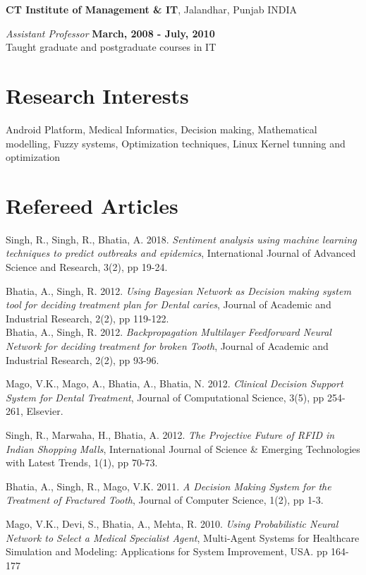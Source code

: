 \documentclass[margin,line]{res}
\begin{document}
\begin{resume}
{\bf CT Institute of Management \& IT}, Jalandhar, Punjab INDIA

\vspace{-.3cm}
{\em Assistant Professor} \hfill {\bf March, 2008 - July, 2010}\\
Taught graduate and postgraduate courses in IT

\section{\sc Research Interests}
Android Platform, Medical Informatics, Decision making, Mathematical modelling, Fuzzy systems, Optimization techniques, Linux Kernel tunning and optimization

\section{\sc Refereed Articles}
Singh, R., Singh, R., Bhatia, A. 2018. \emph{Sentiment analysis using machine learning techniques to predict outbreaks and epidemics}, International Journal of Advanced Science and Research, 3(2), pp 19-24.

Bhatia, A., Singh, R. 2012. \emph{Using Bayesian Network as Decision making system tool for deciding treatment plan for Dental caries}, Journal of Academic and Industrial Research, 2(2), pp 119-122.\\

Bhatia, A., Singh, R. 2012. \emph{Backpropagation Multilayer Feedforward Neural Network for deciding treatment for broken Tooth}, Journal of Academic and Industrial Research, 2(2), pp 93-96.

Mago, V.K., Mago, A., Bhatia, A., Bhatia, N. 2012. \emph{Clinical Decision Support System for Dental Treatment},  Journal of Computational Science, 3(5), pp 254-261, Elsevier.

Singh, R., Marwaha, H., Bhatia, A. 2012. \emph{The Projective Future of RFID in Indian Shopping Malls}, International Journal of Science \& Emerging Technologies with Latest Trends, 1(1), pp 70-73. 

Bhatia, A., Singh, R., Mago, V.K. 2011. \emph{A Decision Making System for the Treatment of Fractured Tooth}, Journal of Computer Science, 1(2), pp 1-3.

Mago, V.K., Devi, S., Bhatia, A., Mehta, R. 2010. \emph{Using Probabilistic Neural Network to Select a Medical Specialist Agent}, Multi-Agent Systems for Healthcare Simulation and Modeling: Applications for System Improvement, USA. pp 164-177


\end{resume}
\end{document}
